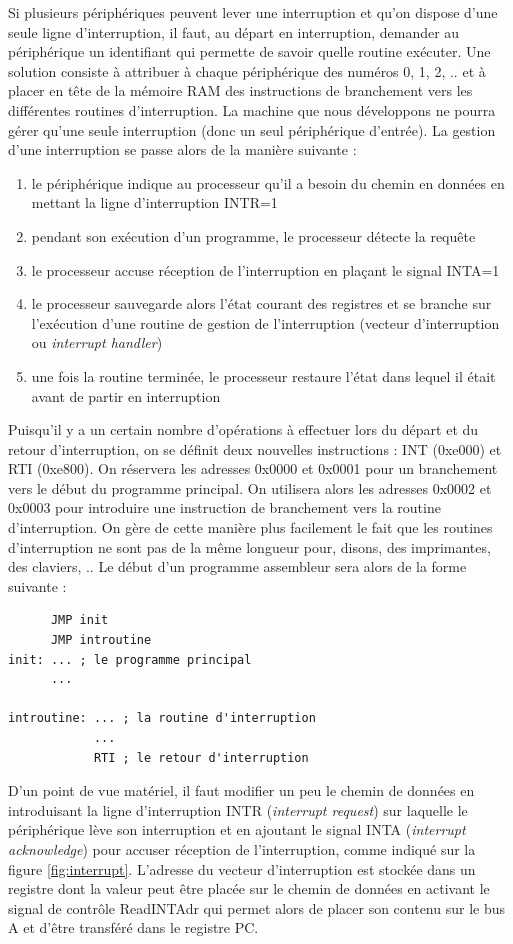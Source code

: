 Si plusieurs périphériques peuvent lever une interruption et qu'on dispose d'une seule ligne d'interruption, il faut, au départ en interruption, demander au périphérique un identifiant qui permette de savoir quelle routine exécuter. Une solution consiste à attribuer à chaque périphérique des numéros 0, 1, 2, .. et à placer en tête de la mémoire RAM des instructions de branchement vers les différentes routines d'interruption. La machine que nous développons ne pourra gérer qu'une seule interruption (donc un seul périphérique d'entrée). La gestion d'une interruption se passe alors de la manière suivante :
\begin{enumerate}
\item le périphérique indique au processeur qu'il a besoin du chemin en données en mettant la ligne d'interruption INTR=1
\item pendant son exécution d'un programme, le processeur détecte la requête
\item le processeur accuse réception de l'interruption en plaçant le signal INTA=1
\item le processeur sauvegarde alors l'état courant des registres et se branche sur l'exécution d'une routine de gestion de l'interruption (vecteur d'interruption ou \emph{interrupt handler})
\item une fois la routine terminée, le processeur restaure l'état dans lequel il était avant de partir en interruption
\end{enumerate}
Puisqu'il y a un certain nombre d'opérations à effectuer lors du départ et du retour d'interruption, on se définit deux nouvelles instructions : INT (0xe000) et RTI (0xe800). On réservera les adresses 0x0000 et 0x0001 pour un branchement vers le début du programme principal. On utilisera alors les adresses 0x0002 et 0x0003 pour introduire une instruction de branchement vers la routine d'interruption. On gère de cette manière plus facilement le fait que les routines d'interruption ne sont pas de la même longueur pour, disons, des imprimantes, des claviers, ..  Le début d'un programme assembleur sera alors de la forme suivante :
\begin{verbatim}
      JMP init
      JMP introutine
init: ... ; le programme principal
      ...

introutine: ... ; la routine d'interruption
            ...
            RTI ; le retour d'interruption
\end{verbatim}

D'un point de vue matériel, il faut modifier un peu le chemin de données en introduisant la ligne d'interruption INTR (\emph{interrupt request}) sur laquelle le périphérique lève son interruption et en ajoutant le signal INTA (\emph{interrupt acknowledge}) pour accuser réception de l'interruption, comme indiqué sur la figure \ref{fig:interrupt}. L'adresse du vecteur d'interruption est stockée dans un registre dont la valeur peut être placée sur le chemin de données en activant le signal de contrôle ReadINTAdr qui permet alors de placer son contenu sur le bus A et d'être transféré dans le registre PC.

